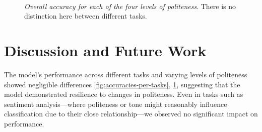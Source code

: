 \documentclass[11pt]{article}
\begin{document}
\begin{figure}[h!]
    \centering
     \\
     \\
     \\
    \caption{\textit{Overall accuracy for each of the four levels of politeness}. There is no distinction here between different tasks.}
    \label{fig:accuracies-per-tone-across-tasks}
\end{figure}

\clearpage

\section{Discussion and Future Work}
The model's performance across different tasks and varying levels of politeness showed negligible differences \ref{fig:accuracies-per-tasks}, \ref{fig:accuracies-per-tone-across-tasks}, suggesting that the model demonstrated resilience to changes in politeness. Even in tasks such as sentiment analysis—where politeness or tone might reasonably influence classification due to their close relationship—we observed no significant impact on performance.
\end{document}
